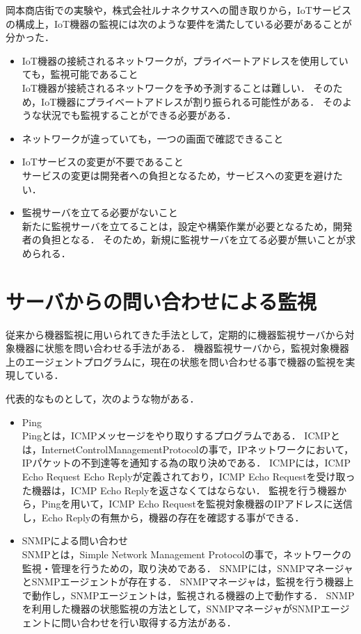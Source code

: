 
岡本商店街での実験や，株式会社ルナネクサスへの聞き取りから，IoTサービスの構成上，IoT機器の監視には次のような要件を満たしている必要があることが分かった．
\begin{itemize}
\item IoT機器の接続されるネットワークが，プライベートアドレスを使用していても，監視可能であること\\
	IoT機器が接続されるネットワークを予め予測することは難しい．
	そのため，IoT機器にプライベートアドレスが割り振られる可能性がある．
	そのような状況でも監視することができる必要がある．
\item ネットワークが違っていても，一つの画面で確認できること
\item IoTサービスの変更が不要であること\\
	サービスの変更は開発者への負担となるため，サービスへの変更を避けたい．
\item 監視サーバを立てる必要がないこと\\
	新たに監視サーバを立てることは，設定や構築作業が必要となるため，開発者の負担となる．
	そのため，新規に監視サーバを立てる必要が無いことが求められる．
\begin{comment}
\item 機器に異常があった場合に，運用者に通知を行う機能があること\\
	常に監視画面を見ているわけには行かないので，アラート機能等があると良い．
\end{comment}
\end{itemize}


\section{サーバからの問い合わせによる監視}
	従来から機器監視に用いられてきた手法として，定期的に機器監視サーバから対象機器に状態を問い合わせる手法がある．
	機器監視サーバから，監視対象機器上のエージェントプログラムに，現在の状態を問い合わせる事で機器の監視を実現している．
	\medskip

	代表的なものとして，次のような物がある．
	\begin{itemize}
		\item Ping\\
			Pingとは，ICMPメッセージをやり取りするプログラムである．
			ICMPとは，InternetControlManagementProtocolの事で，IPネットワークにおいて，IPパケットの不到達等を通知する為の取り決めである．
			ICMPには，ICMP Echo Request Echo Replyが定義されており，ICMP Echo Requestを受け取った機器は，ICMP Echo Replyを返さなくてはならない．
			監視を行う機器から，Pingを用いて，ICMP Echo Requestを監視対象機器のIPアドレスに送信し，Echo Replyの有無から，機器の存在を確認する事ができる．
		\item SNMPによる問い合わせ\\
			SNMPとは，Simple Network Management Protocolの事で，ネットワークの監視・管理を行うための，取り決めである．
			SNMPには，SNMPマネージャとSNMPエージェントが存在する．
			SNMPマネージャは，監視を行う機器上で動作し，SNMPエージェントは，監視される機器の上で動作する．
			SNMPを利用した機器の状態監視の方法として，SNMPマネージャがSNMPエージェントに問い合わせを行い取得する方法がある．
	\end{itemize}
	
